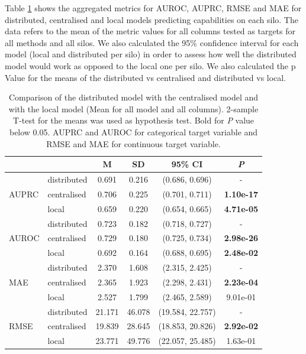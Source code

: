 
Table \ref{tab:allvsall} shows the aggregated metrics for AUROC, AUPRC, RMSE and MAE for distributed, centralised and local models predicting capabilities on each silo. The data refers to the mean of the metric values for all columns tested as targets for all methods and all silos. We also calculated the 95\% confidence interval for each model (local and distributed per silo) in order to assess how well the distributed model would work as opposed to the local one per silo. We also calculated the p Value for the means of the distributed vs centralised and distributed vs local.

\begin{table}[h!] 
 \setlength{\tabcolsep}{7pt} %
 \renewcommand{\arraystretch}{1.3} %
  \captionsetup{justification=centering} 
\centering
\caption[Metrics for centralised model, distributed model and local model]{Comparison of the distributed model with the centralised model and with the local model (Mean for all model and all columns). 2-sample T-test for the means was used as hypothesis test. Bold for \textit{P} value below 0.05. AUPRC and AUROC for categorical target variable and RMSE and MAE for continuous target variable.}

\label{tab:allvsall}
\begin{tabular}{llcccc}
\toprule
 &  & M & SD & 95\% CI & \textit{P}  \\
\midrule
\multirow{3}{*}{AUPRC}
 & distributed & 0.691 & 0.216 & (0.686, 0.696) & - \\
  & centralised & 0.706 & 0.225 & (0.701, 0.711) & \bfseries 1.10e-17 \\
 & local & 0.659 & 0.220 & (0.654, 0.665) & \bfseries 4.71e-05 \\
 \hline

\multirow{3}{*}{AUROC} 
 & distributed & 0.723 & 0.182 & (0.718, 0.727) & - \\
 & centralised & 0.729 & 0.180 & (0.725, 0.734) & \bfseries 2.98e-26 \\
 & local & 0.692 & 0.164 & (0.688, 0.695) & \bfseries 2.48e-02 \\

\hline

\multirow{3}{*}{MAE} 
 & distributed & 2.370 & 1.608 & (2.315, 2.425) & - \\
 & centralised & 2.365 & 1.923 & (2.298, 2.431) & \bfseries 2.23e-04 \\
 & local & 2.527 & 1.799 & (2.465, 2.589) & 9.01e-01 \\

\hline

\multirow{3}{*}{RMSE} 
 & distributed & 21.171 & 46.078 & (19.584, 22.757) & - \\
 & centralised & 19.839 & 28.645 & (18.853, 20.826) & \bfseries 2.92e-02 \\
 & local & 23.771 & 49.776 & (22.057, 25.485) & 1.63e-01 \\
\hline
\end{tabular}
\end{table}
